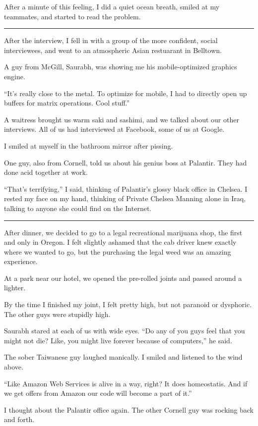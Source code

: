 After a minute of this feeling, I did a quiet ocean breath, smiled at my
teammates, and started to read the problem.

\plainfancybreak{12pt}{2}{* * *}

After the interview, I fell in with a group of the more confident, social
interviewees, and went to an atmospheric Asian restuarant in Belltown.

A guy from McGill, Saurabh, was showing me his mobile-optimized graphics engine.

``It's really close to the metal.  To optimize for mobile, I had to directly
open up buffers for matrix operations.  Cool stuff.''

A waitress brought us warm saki and sashimi, and we talked about our other
interviews.  All of us had interviewed at Facebook, some of us at Google.  

I smiled at myself in the bathroom mirror after pissing.

One guy, also from Cornell, told us about his genius boss at Palantir.  They had
done acid together at work.

``That's terrifying,'' I said, thinking of Palantir's glossy black office in
Chelsea.  I rested my face on my hand, thinking of Private Chelsea Manning alone
in Iraq, talking to anyone she could find on the Internet.

\plainfancybreak{12pt}{2}{* * *}

After dinner, we decided to go to a legal recreational marijuana shop, the first
and only in Oregon.  I felt slightly ashamed that the cab driver knew exactly
where we wanted to go, but the purchasing the legal weed was an amazing
experience.

At a park near our hotel, we opened the pre-rolled joints and passed around a
lighter.  

By the time I finished my joint, I felt pretty high, but not paranoid or
dysphoric.  The other guys were stupidly high.

Saurabh stared at each of us with wide eyes.  ``Do any of you guys feel that you
might not die?  Like, you might live forever because of computers,'' he said.

The sober Taiwanese guy laughed manically.  I smiled and listened to the wind
above.

``Like Amazon Web Services is alive in a way, right?  It does homeostatis.  And
if we get offers from Amazon our code will become a part of it.''

I thought about the Palantir office again.  The other Cornell guy was rocking
back and forth.

